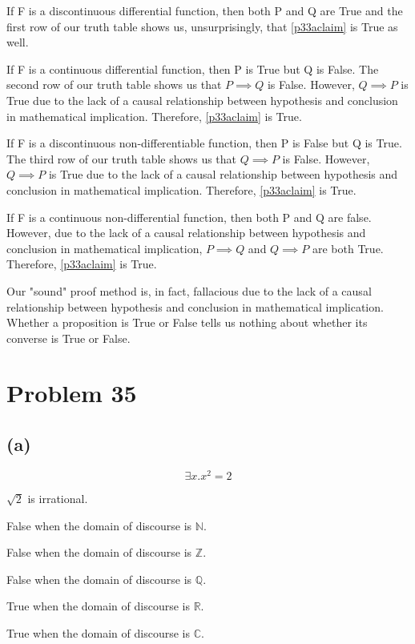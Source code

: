 \documentclass{article}
\begin{document}
If F is a discontinuous differential function, then both P and Q are True and the first row of our truth table shows us, unsurprisingly, that \eqref{p33aclaim} is True as well.

If F is a continuous differential function, then P is True but Q is False. The second row of our truth table shows us that $P \implies Q$ is False. However, $Q \implies P$ is True due to the lack of a causal relationship between hypothesis and conclusion in mathematical implication. Therefore, \eqref{p33aclaim} is True.

If F is a discontinuous non-differentiable function, then P is False but Q is True. The third row of our truth table shows us that $Q \implies P$ is False. However, $Q \implies P$ is True due to the lack of a causal relationship between hypothesis and conclusion in mathematical implication. Therefore, \eqref{p33aclaim} is True.

If F is a continuous non-differential function, then both P and Q are false.  However, due to the lack of a causal relationship between hypothesis and conclusion in mathematical implication, $P \implies Q$ and $Q \implies P$ are both True. Therefore, \eqref{p33aclaim} is True.

Our "sound" proof method is, in fact, fallacious due to the lack of a causal relationship between hypothesis and conclusion in mathematical implication. Whether a proposition is True or False tells us nothing about whether its converse is True or False.

\pagebreak

\section{Problem 35}

\subsection{(a)}
\[
	\exists x.x^2 = 2
\]

$\sqrt{2}$ is irrational.

False when the domain of discourse is $\mathbb{N}$.

False when the domain of discourse is $\mathbb{Z}$.

False when the domain of discourse is $\mathbb{Q}$.

True when the domain of discourse is $\mathbb{R}$.

True when the domain of discourse is $\mathbb{C}$.
\end{document}

